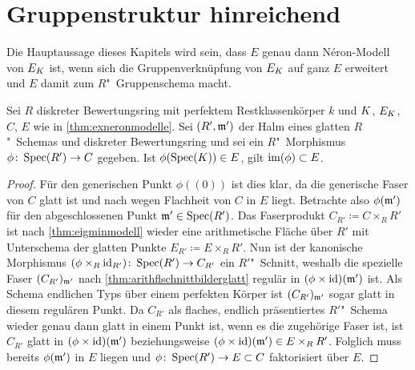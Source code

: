 \section{Gruppenstruktur hinreichend}\label{chap:gruppenstrukturhinreichend}
Die Hauptaussage dieses Kapitels wird sein, dass $E$ genau dann
Néron-Modell von $E_{K}$ ist, wenn sich die Gruppenverknüpfung von
$E_{K}$ auf ganz $E$ erweitert und $E$ damit zum $R$"~Gruppenschema
macht.
\begin{Lemma}\label{thm:schnittearithmflglatt}
  Sei $R$ diskreter Bewertungsring mit perfektem Restklassenkörper
  $k$ und $K$, $E_{K}$, $C$, $E$ wie in \ref{thm:exneronmodelle}.
  Sei $(R',\mathfrak{m}')$ der Halm eines glatten $R$"~Schemas und diskreter
  Bewertungsring
  und sei ein $R$"~Morphismus ${\phi\colon \operatorname{Spec}(R')\to C}$ gegeben.
  Ist ${\phi(\operatorname{Spec}(K))\in E}$, gilt ${\operatorname{im}(\phi)\subset E}$.
  \begin{proof}
    Für den generischen Punkt $\phi((0))$ ist dies klar, da die
    generische Faser von $C$ glatt ist und nach
    \cite[Proposition~8.5/17]{bosch} wegen Flachheit von $C$ in $E$
    liegt. 
    Betrachte also $\phi(\mathfrak{m}')$ für den abgeschlossenen Punkt
    ${\mathfrak{m}'\in\operatorname{Spec}(R')}$.
    Das Faserprodukt ${C_{R'}\coloneqq C\times_R R'}$ ist nach
    \ref{thm:eigminmodell} wieder eine arithmetische Fläche über
    $R'$ mit Unterschema der glatten Punkte
    ${E_{R'}\coloneqq E\times_R R'}$.
    Nun ist der kanonische Morphismus
    $(\phi\times_{R}\mathrm{id}_{R'})\colon\operatorname{Spec}(R')\to C_{R'}$ ein 
    $R'$"~Schnitt, weshalb die spezielle Faser $(C_{R'})_{\mathfrak{m}'}$ nach
    \ref{thm:arithflschnittbilderglatt} regulär in
    $(\phi\times\mathrm{id})(\mathfrak{m}')$ ist.
    Als Schema endlichen Typs über einem
    perfekten Körper ist $(C_{R'})_{\mathfrak{m}'}$ sogar glatt in diesem
    regulären Punkt.
    Da $C_{R'}$ als flaches, endlich präsentiertes $R'$"~Schema wieder
    genau dann glatt in einem Punkt ist, wenn es die zugehörige Faser
    ist, ist $C_{R'}$ glatt in $(\phi\times\mathrm{id})(\mathfrak{m}')$ beziehungsweise
    $(\phi\times\mathrm{id})(\mathfrak{m}')\in E\times_R R'$. Folglich muss bereits
    $\phi(\mathfrak{m}')$ in $E$ liegen und $\phi\colon \operatorname{Spec}(R')\to E\subset C$
    faktorisiert über $E$.
  \end{proof}
\end{Lemma}  

